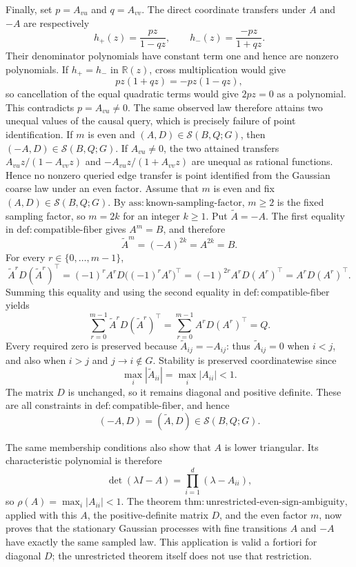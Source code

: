 Finally, set \(p=A_{vu}\) and \(q=A_{vv}\).  The direct coordinate transfers under \(A\) and \(-A\) are respectively
\[
 h_+(z)=\frac{pz}{1-qz},
 \qquad
 h_-(z)=\frac{-pz}{1+qz}.
\]
Their denominator polynomials have constant term one and hence are nonzero polynomials.  If \(h_+=h_-\) in \(\mathbb R(z)\), cross multiplication would give
\[
 pz(1+qz)=-pz(1-qz),
\]
so cancellation of the equal quadratic terms would give \(2pz=0\) as a polynomial.  This contradicts \(p=A_{vu}\ne0\).  The same observed law therefore attains two unequal values of the causal query, which is precisely failure of point identification.
If \(m\) is even and \((A,D)\in\mathcal S(B,Q;G)\), then \((-A,D)\in\mathcal S(B,Q;G)\). If \(A_{vu}\ne0\), the two attained transfers \(A_{vu}z/(1-A_{vv}z)\) and \(-A_{vu}z/(1+A_{vv}z)\) are unequal as rational functions. Hence no nonzero queried edge transfer is point identified from the Gaussian coarse law under an even factor.
Assume that \(m\) is even and fix \((A,D)\in\mathcal S(B,Q;G)\).  By \(\mathrm{ass{:}known\mbox{-}sampling\mbox{-}factor}\), \(m\ge2\) is the fixed sampling factor, so \(m=2k\) for an integer \(k\ge1\).  Put \(\widetilde A=-A\).  The first equality in \(\mathrm{def{:}compatible\mbox{-}fiber}\) gives \(A^m=B\), and therefore
\[
 \widetilde A^m=(-A)^{2k}=A^{2k}=B.
\]
For every \(r\in\{0,\ldots,m-1\}\),
\[
 \widetilde A^rD(\widetilde A^r)^\top
 =(-1)^rA^rD\bigl((-1)^rA^r\bigr)^\top
 =(-1)^{2r}A^rD(A^r)^\top
 =A^rD(A^r)^\top.
\]
Summing this equality and using the second equality in \(\mathrm{def{:}compatible\mbox{-}fiber}\) yields
\[
 \sum_{r=0}^{m-1}\widetilde A^rD(\widetilde A^r)^\top
 =\sum_{r=0}^{m-1}A^rD(A^r)^\top
 =Q.
\]
Every required zero is preserved because \(\widetilde A_{ij}=-A_{ij}\): thus \(\widetilde A_{ij}=0\) when \(i<j\), and also when \(i>j\) and \(j\to i\notin G\).  Stability is preserved coordinatewise since
\[
 \max_i|\widetilde A_{ii}|=\max_i|A_{ii}|<1.
\]
The matrix \(D\) is unchanged, so it remains diagonal and positive definite.  These are all constraints in \(\mathrm{def{:}compatible\mbox{-}fiber}\), and hence
\[
 (-A,D)=(\widetilde A,D)\in\mathcal S(B,Q;G).
\]

The same membership conditions also show that \(A\) is lower triangular.  Its characteristic polynomial is therefore
\[
 \det(\lambda I-A)=\prod_{i=1}^{d}(\lambda-A_{ii}),
\]
so \(\rho(A)=\max_i|A_{ii}|<1\).  The theorem \(\mathrm{thm{:}unrestricted\mbox{-}even\mbox{-}sign\mbox{-}ambiguity}\), applied with this \(A\), the positive-definite matrix \(D\), and the even factor \(m\), now proves that the stationary Gaussian processes with fine transitions \(A\) and \(-A\) have exactly the same sampled law.  This application is valid a fortiori for diagonal \(D\); the unrestricted theorem itself does not use that restriction.

